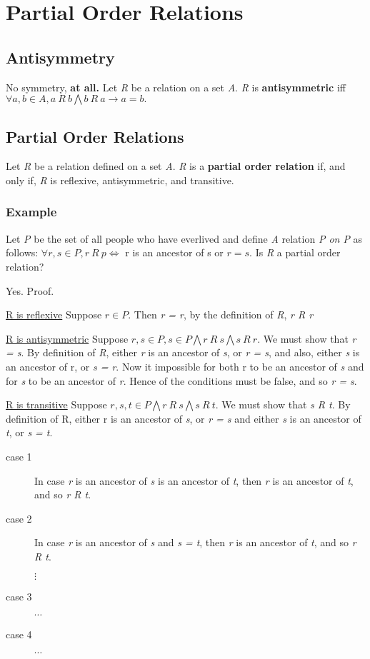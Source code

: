 \documentclass[12pt]{article}
\begin{document}
\section{Partial Order Relations}
\subsection{Antisymmetry}
No symmetry, \textbf{at all.} Let \textit{R} be a relation on a set \textit{A}. \textit{R} is \textbf{antisymmetric} iff $\forall a, b \in A, a \ R \ b \bigwedge b \ R \ a \rightarrow a = b.$

\subsection{Partial Order Relations}
Let \textit{R} be a relation defined on a set \textit{A}. \textit{R} is a \textbf{partial order relation} if, and only if, \textit{R} is reflexive, antisymmetric, and transitive.

\subsubsection{Example}
Let \textit{P} be the set of all people who have everlived and define \textit{A} relation \textit{P on P} as follows: $\forall r, s \in P, r \ R \ p \Leftrightarrow $ r is an ancestor of s or $ r = s $. Is \textit{R} a partial order relation?

Yes. Proof.

\underline{R is reflexive} Suppose $r \in P$. Then \textit{r = r}, by the definition of \textit{R}, \textit{r R r}

\underline{R is antisymmetric} Suppose $r, s \in P, s \in P \bigwedge r \ R \ s \bigwedge s \ R \ r.$ We must show that \textit{r = s}. By definition of \textit{R}, either \textit{r} is an ancestor of \textit{s}, or \textit{r = s}, and also, either \textit{s} is an ancestor of r, or \textit{s = r}. Now it impossible for both r to be an ancestor of \textit{s} and for \textit{s} to be an ancestor of \textit{r}. Hence of the conditions must be false, and so \textit{r = s}.

\underline{R is transitive} Suppose $r, s, t \in P \bigwedge r \ R \ s \bigwedge s \ R \ t$. We must show that \textit{s R t}. By definition of R, either r is an ancestor of \textit{s}, or \textit{r = s} and either \textit{s} is an ancestor of \textit{t}, or \textit{s = t}.

\begin{description}
\item [case 1] In case \textit{r} is an ancestor of \textit{s} is an ancestor of \textit{t}, then \textit{r} is an ancestor of \textit{t}, and so \textit{r R t}.

\item [case 2] In case \textit{r} is an ancestor of \textit{s} and \textit{s = t}, then \textit{r} is an ancestor of \textit{t}, and so \textit{r R t}.

$\vdots$

\item [case 3] $\cdots$
\item [case 4] $\cdots$
\end{description}
\end{document}
